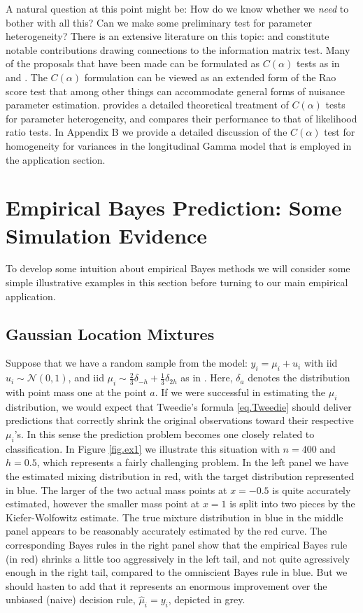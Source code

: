 \documentclass[12pt]{amsart}
\def\NN{\mathcal N}
\begin{document}
A natural question at this point might be:  How do we know whether we {\it need}
to bother with all this?  Can we make some preliminary test for parameter
heterogeneity?  There is an extensive literature on this topic:
 and  constitute notable contributions  
drawing connections to the  information matrix test.
Many of the proposals that have been made can be formulated
as $C(\alpha)$ tests as in  and  
.  The $C(\alpha)$ formulation can be viewed
as an extended form of the Rao score test that among other things can
accommodate general forms of nuisance parameter estimation. 
 provides a detailed theoretical treatment of
$C(\alpha)$ tests for parameter heterogeneity, and   compares 
their performance to that of likelihood ratio tests.
In Appendix B we provide a detailed discussion of the $C(\alpha)$ test for homogeneity
for variances in the longitudinal Gamma model that is employed in the application section.


\section{Empirical Bayes Prediction:  Some Simulation Evidence}
To develop some intuition about empirical Bayes methods we will consider some 
simple illustrative examples in this section before turning to our main
empirical application.

\subsection{Gaussian Location Mixtures}
Suppose that we have a random sample from the model: $y_i = \mu_i + u_i$ with
iid $u_i \sim \NN (0,1)$, and iid $\mu_i \sim \frac{2}{3} \delta_{-h} + 
\frac{1}{3} \delta_{2h}$ as in .  Here, $\delta_a$ denotes
the distribution with point mass one at the point $a$.  If we were successful
in estimating the $\mu_i$ distribution, we would expect that Tweedie's formula
\eqref{eq.Tweedie} should deliver predictions that correctly shrink the
original observations toward their respective $\mu_i$'s.  In this sense the
prediction problem becomes one closely related to classification.  In Figure \ref{fig.ex1}
we illustrate this situation with $n = 400$ and $h = 0.5$, which represents a 
fairly challenging problem.  In the left panel we have the estimated mixing
distribution in red, with the target distribution represented in blue.
The larger of the two actual mass points at $x = -0.5$ is quite accurately
estimated, however the smaller mass point at $x = 1$ is split into two
pieces by the Kiefer-Wolfowitz estimate.  The true mixture distribution
in blue in the middle panel appears to be reasonably accurately estimated
by the red curve.  The corresponding Bayes rules in the right panel show
that the empirical Bayes rule (in red) shrinks a little too aggressively
in the left tail, and not quite agressively enough in the right tail, compared
to the omniscient  Bayes rule in blue.  But we should hasten to add that it
represents an enormous improvement over the unbiased (naive) decision rule,
$\hat \mu_i = y_i$, depicted in grey.
\end{document}
